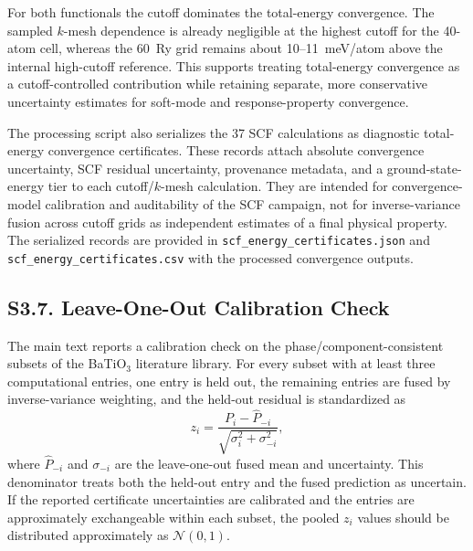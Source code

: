 \documentclass[onecolumn,superscriptaddress,amsmath,amssymb,longbibliography]{revtex4-2}
\begin{document}
For both functionals the cutoff dominates the total-energy convergence. The
sampled $k$-mesh dependence is already negligible at the highest cutoff for
the 40-atom cell, whereas the 60~Ry grid remains about 10--11~meV/atom above
the internal high-cutoff reference. This supports treating total-energy
convergence as a cutoff-controlled contribution while retaining separate,
more conservative uncertainty estimates for soft-mode and response-property
convergence.

The processing script also serializes the 37 SCF calculations as diagnostic
total-energy convergence certificates. These records attach absolute
convergence uncertainty, SCF residual uncertainty, provenance metadata, and a
ground-state-energy tier to each cutoff/$k$-mesh calculation. They are intended
for convergence-model calibration and auditability of the SCF campaign, not for
inverse-variance fusion across cutoff grids as independent estimates of a final
physical property. The serialized records are provided in
\texttt{scf\_energy\_certificates.json} and
\texttt{scf\_energy\_certificates.csv} with the processed convergence outputs.

\subsection{S3.7. Leave-One-Out Calibration Check}

The main text reports a calibration check on the phase/component-consistent
subsets of the BaTiO$_3$ literature library. For every subset with at least
three computational entries, one entry is held out, the remaining entries are
fused by inverse-variance weighting, and the held-out residual is standardized
as
\begin{equation}
    z_i =
    \frac{P_i - \hat{P}_{-i}}
    {\sqrt{\sigma_i^2 + \sigma_{-i}^2}},
\end{equation}
where $\hat{P}_{-i}$ and $\sigma_{-i}$ are the leave-one-out fused mean and
uncertainty. This denominator treats both the held-out entry and the fused
prediction as uncertain. If the reported certificate uncertainties are
calibrated and the entries are approximately exchangeable within each subset,
the pooled $z_i$ values should be distributed approximately as
$\mathcal{N}(0,1)$.
\end{document}
